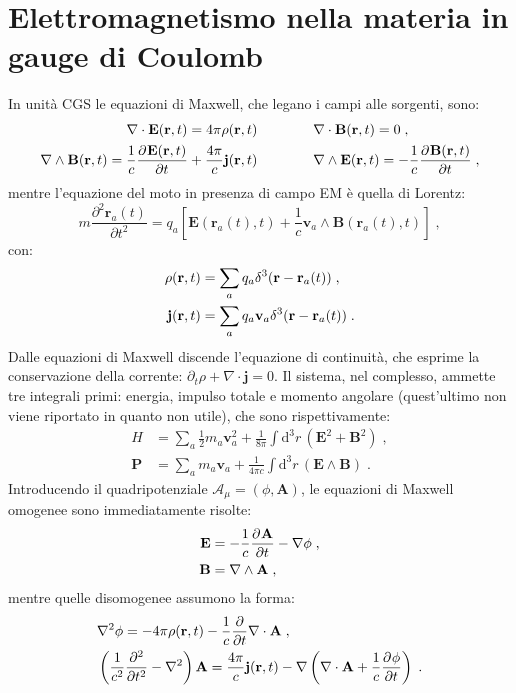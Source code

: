 \documentclass[12pt,a4paper]{report}
\theoremstyle{definition}
\newcommand{\pdev}[3][]{\frac{\partial^{#1} #2}{\partial #3^{#1}}}
\numberwithin{equation}{section}
\newcommand{\diff}[1][]{\mathrm{d}#1}
\begin{document}
\section{Elettromagnetismo nella materia in gauge di Coulomb}
In unità CGS le equazioni di Maxwell, che legano i campi alle sorgenti, sono:
\begin{align}
\nabla\cdot\mathbf{E}(\mathbf{r},t)=4\pi\rho(\mathbf{r},t) \qquad &\qquad \nabla\cdot\mathbf{B}(\mathbf{r},t)=0\;, \notag \\
\nabla\wedge\mathbf{B}(\mathbf{r},t)=\frac{1}{c}\pdev{\mathbf{E}(\mathbf{r},t)}{t}+\frac{4\pi}{c}\mathbf{j}(\mathbf{r},t) \qquad & \qquad \nabla\wedge \mathbf{E}(\mathbf{r},t)=-\frac{1}{c}\pdev{\mathbf{B}(\mathbf{r},t)}{t}\;,
\end{align}
mentre l'equazione del moto in presenza di campo EM è quella di Lorentz:
\begin{equation}
m\pdev[2]{\mathbf{r}_a(t)}{t}=q_a\left[\mathbf{E}(\mathbf{r}_a(t),t)+\frac{1}{c}\mathbf{v}_a\wedge\mathbf{B}(\mathbf{r}_a(t),t)\right]\;,
\end{equation}
con:
\begin{align}
\rho(\mathbf{r},t)&=\sum_a q_a\delta^3(\mathbf{r}-\mathbf{r}_a(t)) \notag\;, \\
\mathbf{j}(\mathbf{r},t) &=\sum_a q_a\mathbf{v}_a\delta^3(\mathbf{r}-\mathbf{r}_a(t))\;.
\end{align}
Dalle equazioni di Maxwell discende l'equazione di continuità, che esprime la conservazione della corrente: $\partial_t\rho+\nabla\cdot\mathbf{j}=0$. Il sistema, nel complesso, ammette tre integrali primi: energia, impulso totale e momento angolare (quest'ultimo non viene riportato in quanto non utile), che sono rispettivamente:
\begin{align}
H&=\sum_a \frac{1}{2}m_a\mathbf{v}_a^2+\frac{1}{8\pi}\int\diff^3{r}\,(\mathbf{E}^2+\mathbf{B}^2) \;,\\
\mathbf{P}&= \sum_a m_a\mathbf{v}_a+\frac{1}{4\pi c}\int\diff^3{r}\,(\mathbf{E}\wedge\mathbf{B})\;.
\end{align}
Introducendo il quadripotenziale $\mathcal{A}_{\mu}=(\phi,\mathbf{A})$, le equazioni di Maxwell omogenee sono immediatamente risolte:
\begin{align}
\mathbf{E} &= -\frac{1}{c}\pdev{\mathbf{A}}{t}-\nabla\phi \notag\;, \\
\mathbf{B} &= \nabla\wedge\mathbf{A}\;,
\end{align}
mentre quelle disomogenee assumono la forma:
\begin{align}
&\nabla^2\phi = -4\pi\rho(\mathbf{r},t)-\frac{1}{c}\frac{\partial}{\partial t}\nabla\cdot\mathbf{A} \notag\;, \\
&\left(\frac{1}{c^2}\frac{\partial^2}{\partial t^2}-\nabla^2\right)\mathbf{A} = \frac{4\pi}{c}\mathbf{j}(\mathbf{r},t)-\nabla\left(\nabla\cdot\mathbf{A}+\frac{1}{c}\pdev{\phi}{t}\right)\;.
\end{align}
\end{document}
